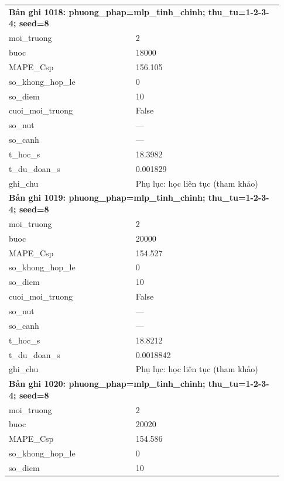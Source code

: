 \begin{longtable}{p{0.43\linewidth}p{0.50\linewidth}}
\midrule
\multicolumn{2}{p{0.95\linewidth}}{\textbf{Bản ghi 1018: phuong\_phap=mlp\_tinh\_chinh; thu\_tu=1-2-3-4; seed=8}} \\
moi\_\allowbreak truong & 2 \\
buoc & 18000 \\
MAPE\_\allowbreak Csp & 156.105 \\
so\_\allowbreak khong\_\allowbreak hop\_\allowbreak le & 0 \\
so\_\allowbreak diem & 10 \\
cuoi\_\allowbreak moi\_\allowbreak truong & False \\
so\_\allowbreak nut & — \\
so\_\allowbreak canh & — \\
t\_\allowbreak hoc\_\allowbreak s & 18.3982 \\
t\_\allowbreak du\_\allowbreak doan\_\allowbreak s & 0.001829 \\
ghi\_\allowbreak chu & Phụ lục: học liên tục (tham khảo) \\
\midrule
\multicolumn{2}{p{0.95\linewidth}}{\textbf{Bản ghi 1019: phuong\_phap=mlp\_tinh\_chinh; thu\_tu=1-2-3-4; seed=8}} \\
moi\_\allowbreak truong & 2 \\
buoc & 20000 \\
MAPE\_\allowbreak Csp & 154.527 \\
so\_\allowbreak khong\_\allowbreak hop\_\allowbreak le & 0 \\
so\_\allowbreak diem & 10 \\
cuoi\_\allowbreak moi\_\allowbreak truong & False \\
so\_\allowbreak nut & — \\
so\_\allowbreak canh & — \\
t\_\allowbreak hoc\_\allowbreak s & 18.8212 \\
t\_\allowbreak du\_\allowbreak doan\_\allowbreak s & 0.0018842 \\
ghi\_\allowbreak chu & Phụ lục: học liên tục (tham khảo) \\
\midrule
\multicolumn{2}{p{0.95\linewidth}}{\textbf{Bản ghi 1020: phuong\_phap=mlp\_tinh\_chinh; thu\_tu=1-2-3-4; seed=8}} \\
moi\_\allowbreak truong & 2 \\
buoc & 20020 \\
MAPE\_\allowbreak Csp & 154.586 \\
so\_\allowbreak khong\_\allowbreak hop\_\allowbreak le & 0 \\
so\_\allowbreak diem & 10 \\

\end{longtable}

